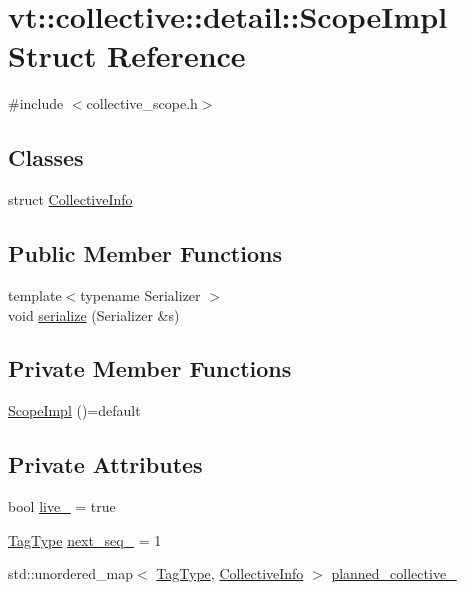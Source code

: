 \hypertarget{structvt_1_1collective_1_1detail_1_1_scope_impl}{}\section{vt\+:\+:collective\+:\+:detail\+:\+:Scope\+Impl Struct Reference}
\label{structvt_1_1collective_1_1detail_1_1_scope_impl}


{\ttfamily \#include $<$collective\+\_\+scope.\+h$>$}

\subsection*{Classes}
\begin{DoxyCompactItemize}
\item 
struct \hyperlink{structvt_1_1collective_1_1detail_1_1_scope_impl_1_1_collective_info}{Collective\+Info}
\end{DoxyCompactItemize}
\subsection*{Public Member Functions}
\begin{DoxyCompactItemize}
\item 
{\footnotesize template$<$typename Serializer $>$ }\\void \hyperlink{structvt_1_1collective_1_1detail_1_1_scope_impl_a16c89c742521a424d377c131f5a3b73f}{serialize} (Serializer \&s)
\end{DoxyCompactItemize}
\subsection*{Private Member Functions}
\begin{DoxyCompactItemize}
\item 
\hyperlink{structvt_1_1collective_1_1detail_1_1_scope_impl_a47576d9402b53721b08154f8fafb2646}{Scope\+Impl} ()=default
\end{DoxyCompactItemize}
\subsection*{Private Attributes}
\begin{DoxyCompactItemize}
\item 
bool \hyperlink{structvt_1_1collective_1_1detail_1_1_scope_impl_a37df162b45d5f4f8222083efdc99183d}{live\+\_\+} = true
\item 
\hyperlink{namespacevt_a84ab281dae04a52a4b243d6bf62d0e52}{Tag\+Type} \hyperlink{structvt_1_1collective_1_1detail_1_1_scope_impl_a66d11b610384061b202fff45d2f18bbf}{next\+\_\+seq\+\_\+} = 1
\item 
std\+::unordered\+\_\+map$<$ \hyperlink{namespacevt_a84ab281dae04a52a4b243d6bf62d0e52}{Tag\+Type}, \hyperlink{structvt_1_1collective_1_1detail_1_1_scope_impl_1_1_collective_info}{Collective\+Info} $>$ \hyperlink{structvt_1_1collective_1_1detail_1_1_scope_impl_a6eaa0beff1bd71895daec9f7ca6152c8}{planned\+\_\+collective\+\_\+}
\end{DoxyCompactItemize}


